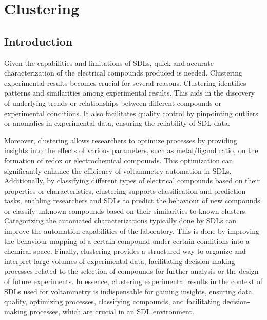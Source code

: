 \chapter{Clustering} \label{chap:chap-2}







\section{Introduction}
Given the capabilities and limitations of SDLs, quick and accurate characterization of the electrical compounds produced is needed. Clustering experimental results becomes crucial for several reasons. 
Clustering identifies patterns and similarities among experimental results. This aids in the discovery of underlying trends or relationships between different compounds or experimental conditions. It also facilitates quality control by pinpointing outliers or anomalies in experimental data, ensuring the reliability of SDL data. 

Moreover, clustering allows researchers to optimize processes by providing insights into the effects of various parameters, such as metal/ligand ratio, on the formation of redox or electrochemical compounds. This optimization can significantly enhance the efficiency of voltammetry automation in SDLs. Additionally, by classifying different types of electrical compounds based on their properties or characteristics, clustering supports classification and prediction tasks, enabling researchers and SDLs to predict the behaviour of new compounds or classify unknown compounds based on their similarities to known clusters. Categorizing the automated characterizations typically done by SDLs can improve the automation capabilities of the laboratory. This is done by improving the behaviour mapping of a certain compound under certain conditions into a chemical space. 
Finally, clustering provides a structured way to organize and interpret large volumes of experimental data, facilitating decision-making processes related to the selection of compounds for further analysis or the design of future experiments. In essence, clustering experimental results in the context of SDLs used for voltammetry is indispensable for gaining insights, ensuring data quality, optimizing processes, classifying compounds, and facilitating decision-making processes, which are crucial in an SDL environment.
